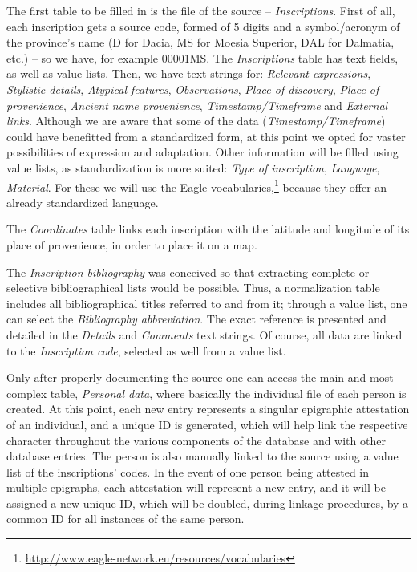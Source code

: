\documentclass[amsthm,ebook]{saparticle}
\begin{document}
The first table to be filled in is the file of the source – \emph{Inscriptions}. First of all, each inscription gets a source
code, formed of 5 digits and a symbol/acronym of the province’s name (D for Dacia, MS for Moesia Superior, DAL for
Dalmatia, etc.) – so we have, for example 00001MS. The \emph{Inscriptions} table has text fields, as well as value lists.
Then, we have text strings for: \emph{Relevant expressions}, \emph{Stylistic details}, \emph{Atypical features}, \emph{Observations}, \emph{Place of discovery}, \emph{Place of provenience}, \emph{Ancient name provenience}, \emph{Timestamp/Timeframe} and \emph{External links}. Although we are
aware that some of the data (\emph{Timestamp/Timeframe}) could have benefitted from a standardized form, at this point we
opted for vaster possibilities of expression and adaptation. Other information will be filled using value lists, as
standardization is more suited: \emph{Type of inscription}, \emph{Language}, \emph{Material}. For these we will use the Eagle
vocabularies,\footnote{\url{http://www.eagle-network.eu/resources/vocabularies}} because they offer an already
standardized language.

The \emph{Coordinates} table links each inscription with the latitude and longitude of its place of provenience, in order to
place it on a map. 

The \emph{Inscription bibliography} was conceived so that extracting complete or selective bibliographical lists would be
possible. Thus, a normalization table includes all bibliographical titles referred to and from it; through a value
list, one can select the \emph{Bibliography abbreviation}. The exact reference is presented and detailed in the \emph{Details} and
\emph{Comments} text strings. Of course, all data are linked to the \emph{Inscription code}, selected as well from a value list.

Only after properly documenting the source one can access the main and most complex table, \emph{Personal data}, where
basically the individual file of each person is created. At this point, each new entry represents a singular epigraphic
attestation of an individual, and a unique ID is generated, which will help link the respective character throughout
the various components of the database and with other database entries. The person is also manually linked to the
source using a value list of the inscriptions’ codes. In the event of one person being attested in
multiple epigraphs, each attestation will represent a new entry, and it will be assigned a new unique ID, which will be
doubled, during linkage procedures, by a common ID for all instances of the same person. 
\end{document}
